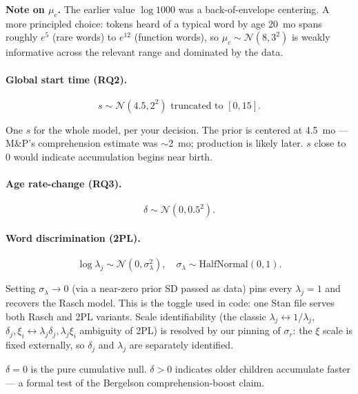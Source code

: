 \documentclass[11pt]{article}
\newcommand{\Norm}{\mathcal{N}}
\newcommand{\HN}{\mathrm{HalfNormal}}
\begin{document}
\textbf{Note on \(\mu_c\).} The earlier value \(\log 1000\) was a
back-of-envelope centering. A more principled choice: tokens heard of a
typical word by age 20~mo spans roughly \(e^5\) (rare words) to \(e^{12}\)
(function words), so \(\mu_c \sim \Norm(8, 3^2)\) is weakly informative
across the relevant range and dominated by the data.

\paragraph{Global start time (RQ2).}
\begin{equation}
s \sim \Norm(4.5, 2^2) \text{ truncated to } [0, 15].
\end{equation}

One $s$ for the whole model, per your decision. The prior is centered at
4.5~mo — M\&P's comprehension estimate was \(\sim\)2~mo; production is
likely later. \(s\) close to 0 would indicate accumulation begins near
birth.

\paragraph{Age rate-change (RQ3).}
\begin{equation}
\delta \sim \Norm(0, 0.5^2).
\end{equation}

\paragraph{Word discrimination (2PL).}
\begin{equation}
\log \lambda_j \sim \Norm(0, \sigma_\lambda^2),
\quad \sigma_\lambda \sim \HN(0, 1).
\end{equation}

Setting \(\sigma_\lambda \to 0\) (via a near-zero prior SD passed as data)
pins every \(\lambda_j = 1\) and recovers the Rasch model. This is the
toggle used in code: one Stan file serves both Rasch and 2PL variants.
Scale identifiability (the classic \(\lambda_j \leftrightarrow 1/\lambda_j\),
\(\delta_j, \xi_i \leftrightarrow \lambda_j \delta_j, \lambda_j \xi_i\)
ambiguity of 2PL) is resolved by our pinning of \(\sigma_r\): the
\(\xi\) scale is fixed externally, so \(\delta_j\) and \(\lambda_j\) are
separately identified.

\(\delta = 0\) is the pure cumulative null. \(\delta > 0\) indicates older
children accumulate faster — a formal test of the Bergelson
comprehension-boost claim.
\end{document}
